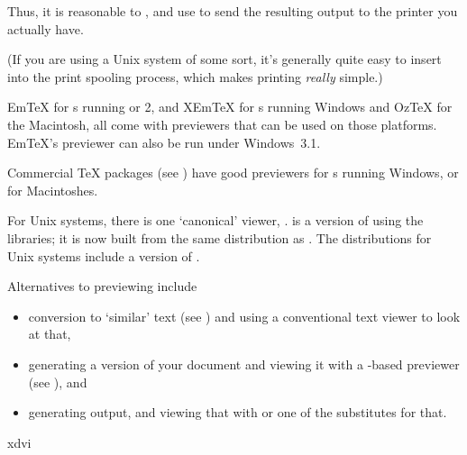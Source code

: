 Thus, it is reasonable to , and
use \href{http://www.ghostscript.com/}{} to send
the resulting \PS{} output to the printer you actually have.

(If you are using a Unix system of some sort, it's generally quite
easy to insert
\href{http://www.ghostscript.com/}{} into the
print spooling process, which makes printing \emph{really} simple.)


Em\TeX{} for s running \MSDOS{} or 2, \miktex{} and
XEm\TeX{} for s running Windows and Oz\TeX{} for the Macintosh, all
come with previewers that can be used on those platforms. Em\TeX{}'s
previewer can also be run under Windows~3.1.

Commercial  \TeX{} packages (see %
)
have good previewers for s running Windows, or for Macintoshes.

For Unix systems, there is one `canonical' viewer, .
 is a version of  using the
 libraries; it is now built from the same distribution
as .  The \texlive{} distributions for Unix systems
include a version of .

Alternatives to previewing include
\begin{itemize}
\item conversion to `similar'  text (see
  ) and using a
  conventional text viewer to look at that,
\item generating a \PS{} version of your document and viewing it
  with a
  \href{http://www.ghostscript.com/}{}-based
  previewer (see 
  ), and
\item generating   output, and viewing that with
    or one of the substitutes for that.
\end{itemize}
\begin{ctanrefs}
\item[xdvi]
\end{ctanrefs}



